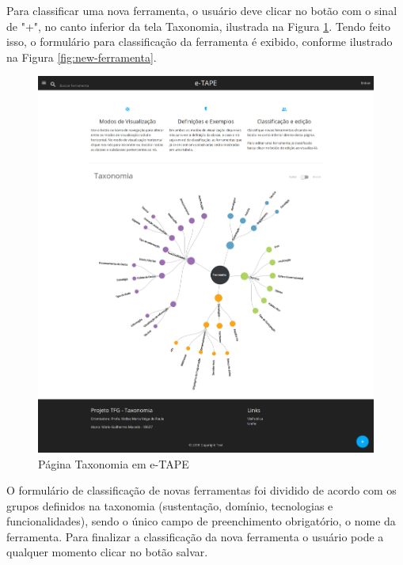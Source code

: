 \par
Para classificar uma nova ferramenta, o usuário deve clicar no botão com o  sinal de "+", no canto inferior da tela Taxonomia, ilustrada na Figura \ref{fig:pag-taxonomia}. Tendo feito isso, o formulário para classificação da ferramenta é exibido, conforme ilustrado na Figura \ref{fig:new-ferramenta}. 

\begin{figure}[!ht]
    \centering
    \includegraphics[scale=0.10]{./figuras/pagina-taxonomia.png}
    \caption{Página Taxonomia em e-TAPE }
    \label{fig:pag-taxonomia}
\end{figure}

\par
O formulário de classificação de novas ferramentas foi dividido de acordo com os grupos definidos na taxonomia 
(sustentação, domínio, tecnologias e funcionalidades), sendo o único campo de preenchimento obrigatório, o nome da ferramenta.
Para finalizar a classificação da nova ferramenta o usuário pode a qualquer momento clicar no botão salvar. 

